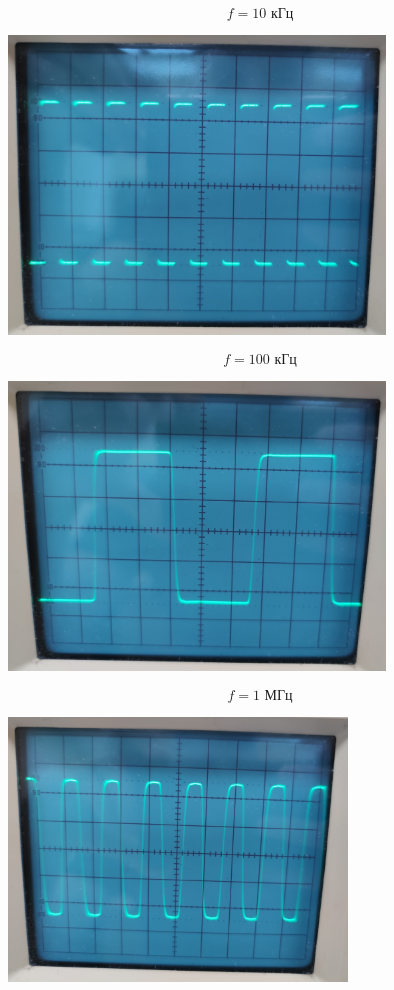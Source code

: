\documentclass[a4paper, 12pt]{article} %
\begin{document}
\[f = 10 \text{ кГц}\]

\begin{center}
    \includegraphics[width=10cm]{5}
\end{center}

\[f = 100 \text{ кГц}\]

\begin{center}
    \includegraphics[width=10cm]{6}
\end{center}

\newpage
\[f = 1 \text{ МГц}\]
\begin{center}
    \includegraphics[width=9cm]{7}
\end{center}
\end{document}
